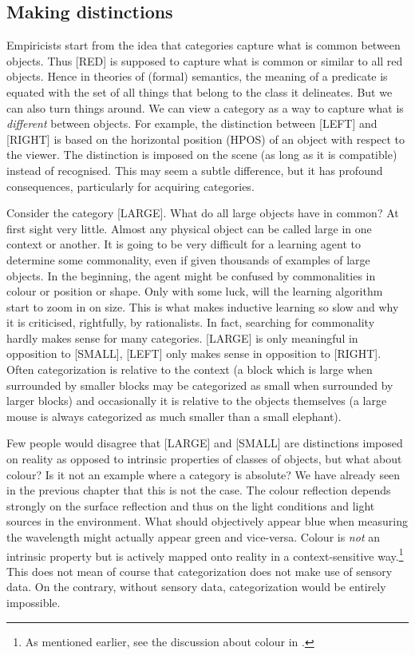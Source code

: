 \subsection{Making distinctions}

Empiricists start from the idea that categories 
capture what is common
between objects. Thus [RED] is supposed to capture 
what is common or similar to all 
red objects. Hence in theories of 
(formal) semantics, the meaning of a predicate is 
equated with the set of all things that 
belong to the class it delineates. 
But we can also turn things around. We can 
view a category as a way to capture what is {\itshape different} 
between objects. For example, the distinction between 
[LEFT] and [RIGHT] is based on the horizontal position (HPOS)
of an object with respect to the viewer. 
The distinction is imposed on the scene (as long as 
it is compatible) instead of 
recognised. This may seem a subtle difference, but it
has profound consequences, particularly for acquiring
categories.

Consider the category [LARGE]. What do all large 
objects have in common? At first sight very little. 
Almost any physical object can be called large in 
one context or another. 
It is going to be very difficult for a learning agent
to determine some commonality, even if given thousands 
of examples of large objects. In the beginning, the agent
might be confused by commonalities in 
colour or position or shape. 
Only with some luck, will the learning algorithm
start to zoom in on size. 
This is what makes inductive learning so slow and 
why it is criticised, rightfully, by rationalists. 
In fact, searching for commonality hardly makes sense for
many categories. [LARGE] is only meaningful in
opposition to [SMALL], [LEFT] only makes sense
in opposition to [RIGHT]. Often categorization
is relative to the context (a block which is large when surrounded
by smaller blocks may be categorized as
small when surrounded by larger
blocks) and occasionally it is relative to the objects themselves
(a large mouse is always categorized as
much smaller than a small elephant). 

Few people would disagree that [LARGE] and [SMALL] are
distinctions imposed on reality as opposed to intrinsic
properties of classes of objects, but what about colour? Is it
not an example where a category is absolute? We have 
already seen in the previous chapter that this is not 
the case. The colour reflection depends strongly on the 
surface reflection and thus on the light conditions and
light sources in the environment. What should objectively 
appear blue when measuring the wavelength might actually 
appear green and vice-versa. Colour is {\itshape not}
an intrinsic property but is actively mapped onto reality
in a context-sensitive way.\footnote{
As mentioned earlier, see the discussion about colour 
in \cite{Varela:1991}.}
This does not mean of course that categorization does not make use of sensory
data. On the contrary, without sensory data, categorization
would be entirely impossible. 

